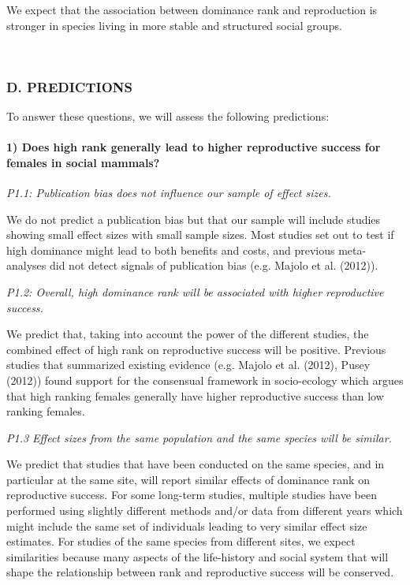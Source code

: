 \documentclass[]{article}
\let\oldparagraph\paragraph
\renewcommand{\paragraph}[1]{\oldparagraph{#1}\mbox{}}
\begin{document}
We expect that the association between dominance rank and reproduction
is stronger in species living in more stable and structured social
groups.

~

\hypertarget{d.-predictions}{%
\subsubsection{D. PREDICTIONS}\label{d.-predictions}}

To answer these questions, we will assess the following predictions: ~

\hypertarget{does-high-rank-generally-lead-to-higher-reproductive-success-for-females-in-social-mammals-1}{%
\paragraph{\texorpdfstring{\textbf{1) Does high rank generally lead to
higher reproductive success for females in social
mammals?}}{1) Does high rank generally lead to higher reproductive success for females in social mammals?}}\label{does-high-rank-generally-lead-to-higher-reproductive-success-for-females-in-social-mammals-1}}

\emph{P1.1: Publication bias does not influence our sample of effect
sizes.}

We do not predict a publication bias but that our sample will include
studies showing small effect sizes with small sample sizes. Most studies
set out to test if high dominance might lead to both benefits and costs,
and previous meta-analyses did not detect signals of publication bias
(e.g. Majolo et al. (2012)).

\emph{P1.2: Overall, high dominance rank will be associated with higher
reproductive success.}

We predict that, taking into account the power of the different studies,
the combined effect of high rank on reproductive success will be
positive. Previous studies that summarized existing evidence (e.g.
Majolo et al. (2012), Pusey (2012)) found support for the consensual
framework in socio-ecology which argues that high ranking females
generally have higher reproductive success than low ranking females.

\emph{P1.3 Effect sizes from the same population and the same species
will be similar.}

We predict that studies that have been conducted on the same species,
and in particular at the same site, will report similar effects of
dominance rank on reproductive success. For some long-term studies,
multiple studies have been performed using slightly different methods
and/or data from different years which might include the same set of
individuals leading to very similar effect size estimates. For studies
of the same species from different sites, we expect similarities because
many aspects of the life-history and social system that will shape the
relationship between rank and reproductive success will be conserved.
\end{document}
